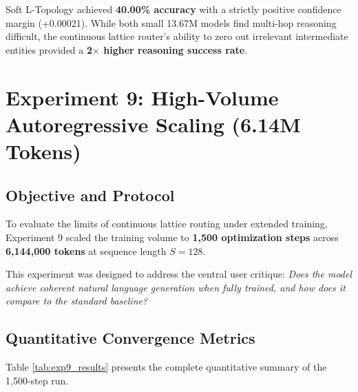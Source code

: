 Soft L-Topology achieved \textbf{40.00\% accuracy} with a strictly positive confidence margin (+0.00021). While both small 13.67M models find multi-hop reasoning difficult, the continuous lattice router's ability to zero out irrelevant intermediate entities provided a \textbf{2$\times$ higher reasoning success rate}.

\section{Experiment 9: High-Volume Autoregressive Scaling (6.14M Tokens)}
\label{sec:exp9}

\subsection{Objective and Protocol}
To evaluate the limits of continuous lattice routing under extended training, Experiment 9 scaled the training volume to \textbf{1,500 optimization steps} across \textbf{6,144,000 tokens} at sequence length $S = 128$. 

This experiment was designed to address the central user critique: \textit{Does the model achieve coherent natural language generation when fully trained, and how does it compare to the standard baseline?}

\subsection{Quantitative Convergence Metrics}
Table \ref{tab:exp9_results} presents the complete quantitative summary of the 1,500-step run.


